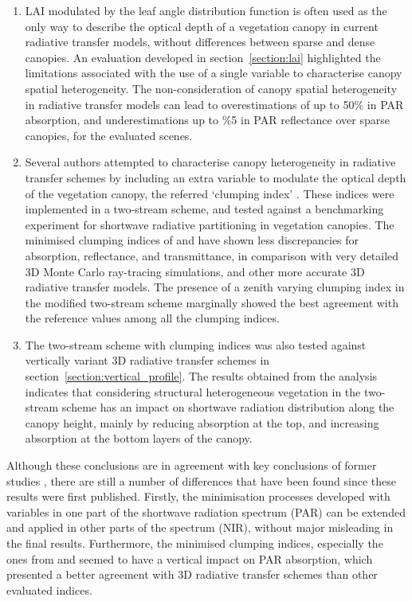 \documentclass[a4paper,11pt]{report}
\begin{document}
\begin{enumerate}
\item LAI modulated by the leaf angle distribution function is often used as the only way to describe the optical depth of a vegetation canopy in current radiative transfer models, without differences between sparse and dense canopies. An evaluation developed in section~\ref{section:lai} highlighted the limitations associated with the use of a single variable to characterise canopy spatial heterogeneity. The non-consideration of canopy spatial heterogeneity in radiative transfer models can lead to overestimations of up to 50\% in PAR absorption, and underestimations up to \%5 in PAR reflectance over sparse canopies, for the evaluated scenes.
\item Several authors attempted to characterise canopy heterogeneity in radiative transfer schemes by including an extra variable to modulate the optical depth of the vegetation canopy, the referred `clumping index' \citep{Nilson1971,Kucharik1999,pinty2006,Ni-Meister2010}. These indices were implemented in a two-stream scheme, and tested against a benchmarking experiment for shortwave radiative partitioning in vegetation canopies. The minimised clumping indices of \citet{Nilson1971} and \citet{pinty2006} have shown less discrepancies for absorption, reflectance, and transmittance, in comparison with very detailed 3D Monte Carlo ray-tracing simulations, and other more accurate 3D radiative transfer models. The presence of a zenith varying clumping index in the modified two-stream scheme marginally showed the best agreement with the reference values among all the clumping indices.
\item The two-stream scheme with clumping indices was also tested against vertically variant 3D radiative transfer schemes in section~\ref{section:vertical_profile}. The results obtained from the analysis indicates that considering structural heterogeneous vegetation in the two-stream scheme has an impact on shortwave radiation distribution along the canopy height, mainly by reducing absorption at the top, and increasing absorption at the bottom layers of the canopy.
\end{enumerate} 

Although these conclusions are in agreement with key conclusions of former studies \citep{pinty2006,loew2014}, there are still a number of differences that have been found since these results were first published. Firstly, the minimisation processes developed with variables in one part of the shortwave radiation spectrum (PAR) can be extended and applied in other parts of the spectrum (NIR), without major misleading in the final results. Furthermore, the minimised clumping indices, especially the ones from \citet{Nilson1971} and \citet{pinty2006} seemed to have a vertical impact on PAR absorption, which presented a better agreement with 3D radiative transfer schemes than other evaluated indices. 
\end{document}
